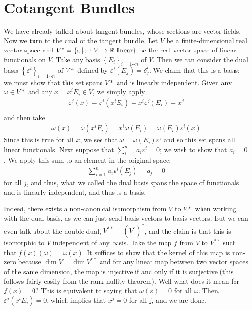 \documentclass{../mathnotes}
\begin{document}
\section{Cotangent Bundles}

We have already talked about tangent bundles, whose sections are vector fields. Now we turn to the dual of the tangent bundle.
Let $V$ be a finite-dimensional real vector space and $V^*=\left\{ \omega|\omega:V\to \mathbb{R}\;{\rm linear} \right\}$ be the real vector space of linear functionals on $V$.
Take any basis $\left\{ E_i \right\}_{i=1\cdots n}$ of $V$. Then we can consider the dual basis $\left\{ \varepsilon^i \right\}_{i=1\cdots n}$
of $V*$ defined by $\varepsilon^i(E_j)=\delta^i_j$. We claim that this is a basis; we must show that this set spans $V*$ and is linearly independent.
Given any $\omega\in V*$ and any $x=x^iE_i\in V$, we simply apply
\begin{align*}
    \varepsilon^j(x)=\varepsilon^j(x^iE_i)=x^i\varepsilon^j(E_i)=x^j\\
\end{align*}
and then take
\begin{align*}
    \omega(x)=\omega(x^iE_i)=x^i\omega(E_i)=\omega(E_i)\varepsilon^i(x)
\end{align*}
Since this is true for all $x$, we see that $\omega=\omega(E_i)\varepsilon^i$ and so this set spans all linear functionals.
Next suppose that $\sum_{i=1}^n a_i\varepsilon^i=0$; we wish to show that $a_i=0$. We apply this sum to an element in the original space:
\begin{align*}
    \sum_{i=1}^n a_i\varepsilon^i(E_j)=a_j=0
\end{align*}
for all $j$, and thus, what we called the dual basis spans the space of functionals and is linearly independent, and thus is a basis.

Indeed, there exists a non-canonical isomorphism from $V$ to $V*$ when working with the dual basis, as we can just send basis vectors to basis vectors.
But we can even talk about the double dual, $V^{**}=(V^*)^*$, and the claim is that this is isomorphic to $V$ independent of any basis.
Take the map $f$ from $V$ to $V^{**}$ such that $f(x)(\omega)=\omega(x)$. It suffices to show that the kernel of this map is non-zero
because $\dim V=\dim V^{**}$ and for any linear map between two vector spaces of the same dimension, the map is injective if and only
if it is surjective (this follows fairly easily from the rank-nullity theorem). Well what does it mean for $f(x)=0$? This is equivalent to
saying that $\omega(x)=0$ for all $\omega$. Then, $\varepsilon^j(x^iE_i)=0$, which implies that $x^j=0$ for all $j$, and we are done.
\end{document}
